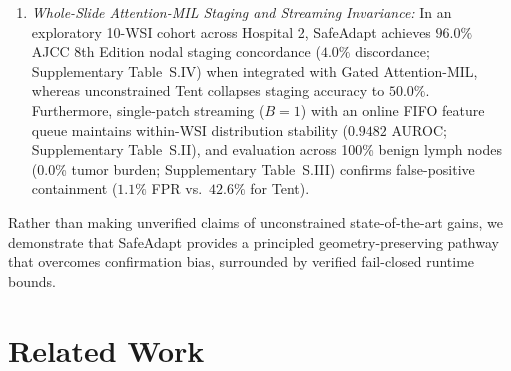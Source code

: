 \documentclass[journal]{IEEEtran}
\begin{document}
\begin{enumerate}
\item \textit{Whole-Slide Attention-MIL Staging and Streaming Invariance:} In an exploratory 10-WSI cohort across Hospital 2, SafeAdapt achieves $96.0\%$ AJCC 8th Edition nodal staging concordance ($4.0\%$ discordance; Supplementary Table~S.IV) when integrated with Gated Attention-MIL, whereas unconstrained Tent collapses staging accuracy to $50.0\%$. Furthermore, single-patch streaming ($B=1$) with an online FIFO feature queue maintains within-WSI distribution stability ($0.9482$ AUROC; Supplementary Table~S.II), and evaluation across 100\% benign lymph nodes (0.0\% tumor burden; Supplementary Table~S.III) confirms false-positive containment ($1.1\%$ FPR vs.\ $42.6\%$ for Tent).
\end{enumerate}

Rather than making unverified claims of unconstrained state-of-the-art gains, we demonstrate that SafeAdapt provides a principled geometry-preserving pathway that overcomes confirmation bias, surrounded by verified fail-closed runtime bounds.

\section{Related Work}
\end{document}
